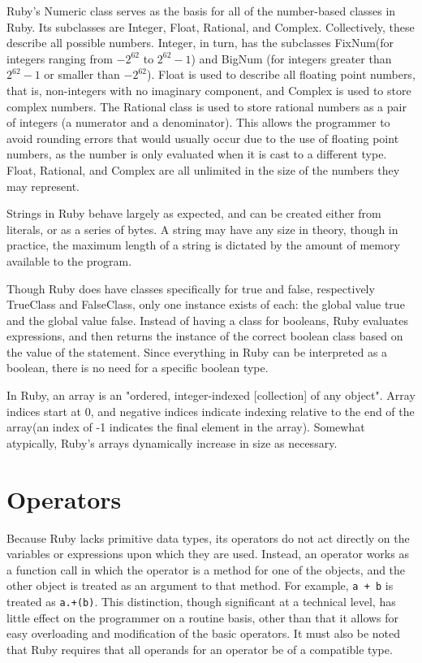 \documentclass[12pt]{article}
\begin{document}
Ruby's Numeric class serves as the basis for all of the number-based classes in Ruby. Its subclasses are Integer, Float, Rational, and Complex. Collectively, these describe all possible numbers. Integer, in turn, has the subclasses FixNum(for integers ranging from $-2^{62}$ to $2^{62} - 1$) and BigNum (for integers greater than $2^{62}-1$ or smaller than $-2^{62}$). Float is used to describe all floating point numbers, that is, non-integers with no imaginary component, and Complex is used to store complex numbers. The Rational class is used to store rational numbers as a pair of integers (a numerator and a denominator). This allows the programmer to avoid rounding errors that would usually occur due to the use of floating point numbers, as the number is only evaluated when it is cast to a different type. Float, Rational, and Complex are all unlimited in the size of the numbers they may represent\cite{rubydocs}.

Strings in Ruby behave largely as expected, and can be created either from literals, or as a series of bytes. A string may have any size in theory, though in practice, the maximum length of a string is dictated by the amount of memory available to the program.

Though Ruby does have classes specifically for true and false, respectively TrueClass and FalseClass, only one instance exists of each: the global value true and the global value false. Instead of having a class for booleans, Ruby evaluates expressions, and then returns the instance of the correct boolean class based on the value of the statement. Since everything in Ruby can be interpreted as a boolean, there is no need for a specific boolean type\cite{forumbool}.

In Ruby, an array is an "ordered, integer-indexed [collection] of any object"\cite{docsarray}. Array indices start at 0, and negative indices indicate indexing relative to the end of the array(an index of -1 indicates the final element in the array). Somewhat atypically, Ruby's arrays dynamically increase in size as necessary\cite{docsarray}.



\section{Operators}
Because Ruby lacks primitive data types, its operators do not act directly on the variables or expressions upon which they are used. Instead, an operator works as a function call in which the operator is a method for one of the objects, and the other object is treated as an argument to that method. For example, \verb|a + b| is treated as \verb|a.+(b)|. This distinction, though significant at a technical level, has little effect on the programmer on a routine basis, other than that it allows for easy overloading and modification of the basic operators. It must also be noted that Ruby requires that all operands for an operator be of a compatible type\cite{opstut}.
\end{document}
